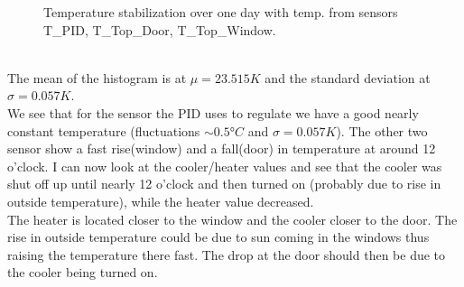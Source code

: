 \documentclass[12pt]{scrartcl}
\begin{document}
\begin{figure}[h!]
          \caption{Temperature stabilization over one day with temp. from
          sensors T\_PID, T\_Top\_Door, T\_Top\_Window.}
          \label{fig11}
        \end{figure} \\
        The mean of the histogram is at $\mu = 23.515K$ and the standard
        deviation at $\sigma = 0.057K.$ \\
        We see that for the sensor the PID uses to regulate we have a good
        nearly constant temperature (fluctuations $\sim 0.5 °C$ and
        $\sigma = 0.057K$). The other two sensor show a fast rise(window) and a
        fall(door) in temperature at around 12 o'clock. I can now look at the
        cooler/heater values and see that the cooler was shut off up until
        nearly 12 o'clock and then turned on (probably due to rise in outside
        temperature), while the heater value decreased. \\
        The heater is located closer to the window and the cooler closer to the
        door.
        The rise in outside temperature could be due to sun coming in the
        windows thus raising the temperature there fast. The drop at the door
        should then be due to the cooler being turned on.
      \newpage
\end{document}
